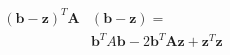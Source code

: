 \documentclass[10pt]{article}
\begin{document}
\begin{align*}\begin{split}
\left( \boldsymbol b - \boldsymbol z \right)^T \boldsymbol A & \left( \boldsymbol b - \boldsymbol z \right) = \\
& \boldsymbol b^T A \boldsymbol b -2 \boldsymbol b^T \boldsymbol A \boldsymbol z + \boldsymbol z^T \boldsymbol z \\
\end{split}\end{align*}
\end{document}
